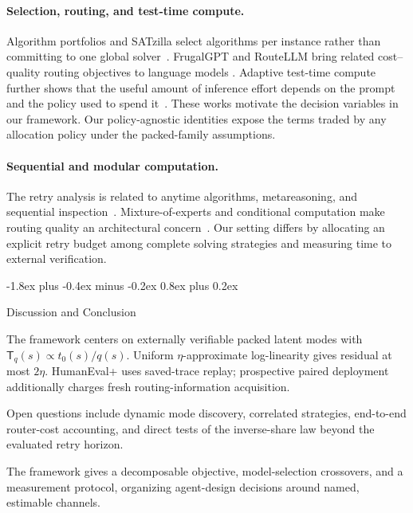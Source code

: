 \documentclass[10pt,twocolumn]{article}
\makeatletter
\theoremstyle{paperplain}
\theoremstyle{paperdefinition}
\theoremstyle{paperremark}
\renewcommand{\section}{%
  \@startsection{section}{1}{\z@}%
    {-1.8ex plus -0.4ex minus -0.2ex}%
    {0.8ex plus 0.2ex}%
    {\normalfont\large\bfseries\raggedright}}
\makeatother
\begin{document}
\paragraph{Selection, routing, and test-time compute.}
Algorithm portfolios and SATzilla select algorithms per instance rather than
committing to one global solver~\cite{gomes-selman2001,
xu_hutter_hoos_leytonbrown_2008_satzilla}.  FrugalGPT and RouteLLM bring related
cost--quality routing objectives to language models
\cite{chen2023frugalgpt,ong2024routellm}.  Adaptive test-time compute further
shows that the useful amount of inference effort depends on the prompt and the
policy used to spend it~\cite{snell2024testtime}.  These works motivate the
decision variables in our framework.  Our policy-agnostic identities expose the
terms traded by any allocation policy under the packed-family assumptions.

\paragraph{Sequential and modular computation.}
The retry analysis is related to anytime algorithms, metareasoning, and
sequential inspection~\cite{zilberstein_1996_anytime_systems,
hansen_2001_monitoring_anytime,russell_wefald_1991_dotherightthing,weitzman1979,
wald1947,chernoff1959}.  Mixture-of-experts and conditional computation make
routing quality an architectural concern~\cite{jordan_jacobs_1994_hme,
shazeer_2017_moe,fedus_zoph_shazeer_2022_switch}.  Our setting differs by
allocating an explicit retry budget among complete solving strategies and
measuring time to external verification.

\section{Discussion and Conclusion}
\label{sec:discussion}

The framework centers on externally verifiable packed latent modes with
$\mathsf{T}_q(s)\propto t_0(s)/q(s)$.  Uniform $\eta$-approximate
log-linearity gives residual at most $2\eta$.  HumanEval+ uses saved-trace
replay; prospective paired deployment additionally charges fresh
routing-information acquisition.

Open questions include dynamic mode discovery, correlated strategies,
end-to-end router-cost accounting, and direct tests of the inverse-share law
beyond the evaluated retry horizon.

The framework gives a decomposable objective, model-selection crossovers, and a
measurement protocol, organizing agent-design decisions around named,
estimable channels.
\end{document}
